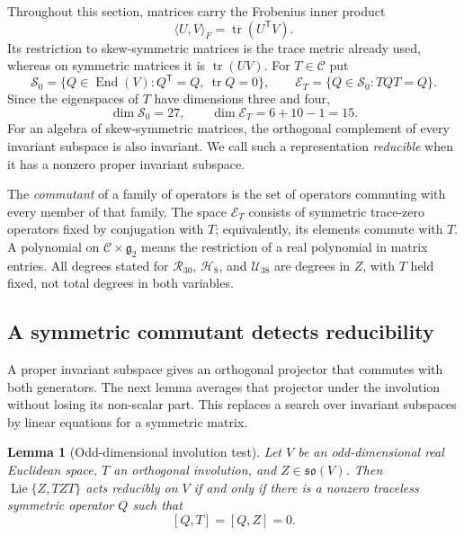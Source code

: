 \documentclass[11pt,a4paper]{article}
\newtheorem{lemma}[lemma]{Lemma}
\newcommand{\Lie}{\operatorname{Lie}}
\begin{document}
Throughout this section, matrices carry the Frobenius inner product
\[
\langle U,V\rangle_F=\operatorname{tr}(U^{\mathsf T}V).
\]
Its restriction to skew-symmetric matrices is the trace metric already used, whereas on symmetric matrices it is $\operatorname{tr}(UV)$.  For $T\in\mathscr C$ put
\[
\mathscr S_0=\{Q\in\operatorname{End}(V):Q^{\mathsf T}=Q,\ \operatorname{tr}Q=0\},
\qquad
\mathscr E_T=\{Q\in\mathscr S_0:TQT=Q\}.
\]
Since the eigenspaces of $T$ have dimensions three and four,
\[
\dim\mathscr S_0=27,\qquad \dim\mathscr E_T=6+10-1=15.
\]
For an algebra of skew-symmetric matrices, the orthogonal complement of every invariant subspace is also invariant.  We call such a representation \emph{reducible} when it has a nonzero proper invariant subspace.

The \emph{commutant} of a family of operators is the set of operators commuting with every member of that family.  The space $\mathscr E_T$ consists of symmetric trace-zero operators fixed by conjugation with $T$; equivalently, its elements commute with $T$.  A polynomial on $\mathscr C\times\mathfrak g_2$ means the restriction of a real polynomial in matrix entries.  All degrees stated for $\mathcal R_{30}$, $\mathcal H_8$, and $\mathcal U_{38}$ are degrees in $Z$, with $T$ held fixed, not total degrees in both variables.

\subsection{A symmetric commutant detects reducibility}

A proper invariant subspace gives an orthogonal projector that commutes with
both generators.  The next lemma averages that projector under the involution
without losing its non-scalar part.  This replaces a search over invariant
subspaces by linear equations for a symmetric matrix.

\begin{lemma}[Odd-dimensional involution test]
\label{lem:odd-commutant}
Let $V$ be an odd-dimensional real Euclidean space, $T$ an orthogonal involution, and $Z\in\mathfrak{so}(V)$.  Then $\Lie\{Z,TZT\}$ acts reducibly on $V$ if and only if there is a nonzero traceless symmetric operator $Q$ such that
\[
[Q,T]=[Q,Z]=0.
\]
\end{lemma}
\end{document}
